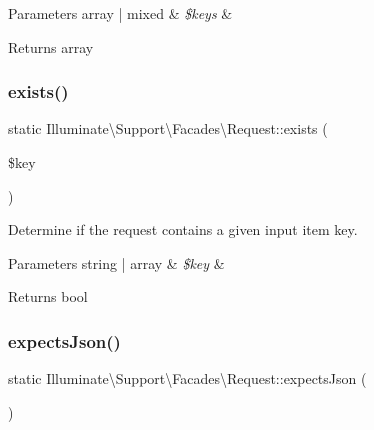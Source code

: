 \begin{DoxyParams}[1]{Parameters}
array | mixed & {\em \$keys} & \\
\hline
\end{DoxyParams}
\begin{DoxyReturn}{Returns}
array 
\end{DoxyReturn}
\mbox{\label{class_illuminate_1_1_support_1_1_facades_1_1_request_aa5ac5c2ba1148e6e342cc0bdb6e341b0}} 
\subsubsection{\texorpdfstring{exists()}{exists()}}
{\footnotesize\ttfamily static Illuminate\textbackslash{}\+Support\textbackslash{}\+Facades\textbackslash{}\+Request\+::exists (\begin{DoxyParamCaption}\item[{}]{\$key }\end{DoxyParamCaption})\hspace{0.3cm}{\ttfamily [static]}}

Determine if the request contains a given input item key.


\begin{DoxyParams}[1]{Parameters}
string | array & {\em \$key} & \\
\hline
\end{DoxyParams}
\begin{DoxyReturn}{Returns}
bool 
\end{DoxyReturn}
\mbox{\label{class_illuminate_1_1_support_1_1_facades_1_1_request_a4524cc3911f859ab2da48657b2c87613}} 
\subsubsection{\texorpdfstring{expects\+Json()}{expectsJson()}}
{\footnotesize\ttfamily static Illuminate\textbackslash{}\+Support\textbackslash{}\+Facades\textbackslash{}\+Request\+::expects\+Json (\begin{DoxyParamCaption}{ }\end{DoxyParamCaption})\hspace{0.3cm}{\ttfamily [static]}}

